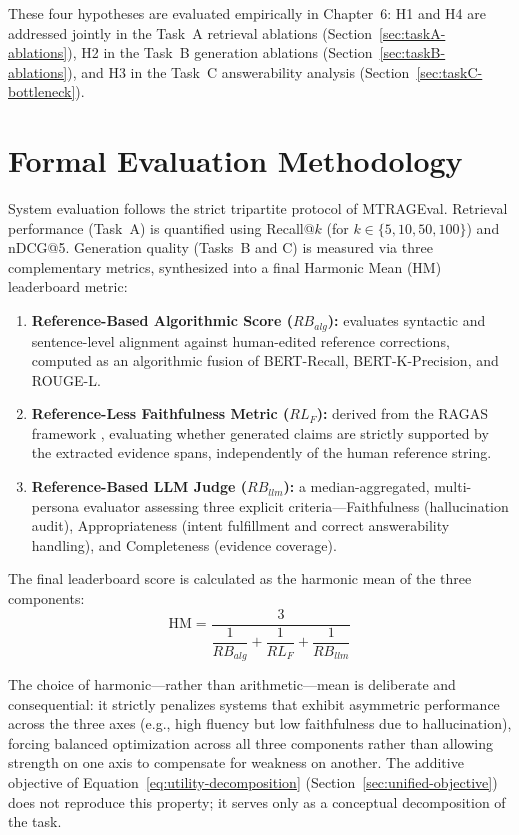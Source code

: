 These four hypotheses are evaluated empirically in Chapter~6: H1 and H4 are addressed jointly in the Task~A retrieval ablations (Section~\ref{sec:taskA-ablations}), H2 in the Task~B generation ablations (Section~\ref{sec:taskB-ablations}), and H3 in the Task~C answerability analysis (Section~\ref{sec:taskC-bottleneck}).

\section{Formal Evaluation Methodology}
\label{sec:eval-methodology}

System evaluation follows the strict tripartite protocol of MTRAGEval. Retrieval performance (Task~A) is quantified using Recall@$k$ (for $k \in \{5, 10, 50, 100\}$) and nDCG@5. Generation quality (Tasks~B and C) is measured via three complementary metrics, synthesized into a final Harmonic Mean (HM) leaderboard metric:

\begin{enumerate}
    \item \textbf{Reference-Based Algorithmic Score ($RB_{alg}$):} evaluates syntactic and sentence-level alignment against human-edited reference corrections, computed as an algorithmic fusion of BERT-Recall, BERT-K-Precision, and ROUGE-L.
    \item \textbf{Reference-Less Faithfulness Metric ($RL_F$):} derived from the RAGAS framework \citep{es2024ragas}, evaluating whether generated claims are strictly supported by the extracted evidence spans, independently of the human reference string.
    \item \textbf{Reference-Based LLM Judge ($RB_{llm}$):} a median-aggregated, multi-persona evaluator assessing three explicit criteria---Faithfulness (hallucination audit), Appropriateness (intent fulfillment and correct answerability handling), and Completeness (evidence coverage).
\end{enumerate}

The final leaderboard score is calculated as the harmonic mean of the three components:
\begin{equation}
\text{HM} = \frac{3}{\dfrac{1}{RB_{alg}} + \dfrac{1}{RL_F} + \dfrac{1}{RB_{llm}}}
\label{eq:hm}
\end{equation}

The choice of harmonic---rather than arithmetic---mean is deliberate and consequential: it strictly penalizes systems that exhibit asymmetric performance across the three axes (e.g., high fluency but low faithfulness due to hallucination), forcing balanced optimization across all three components rather than allowing strength on one axis to compensate for weakness on another. The additive objective of Equation~\eqref{eq:utility-decomposition} (Section~\ref{sec:unified-objective}) does not reproduce this property; it serves only as a conceptual decomposition of the task.

